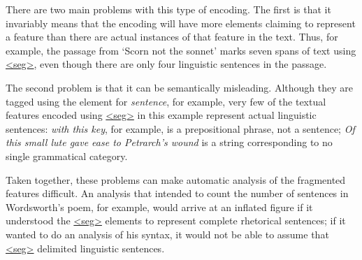 There are two main problems with this type of encoding. The first is that it invariably means that the encoding will have more elements claiming to represent a feature than there are actual instances of that feature in the text. Thus, for example, the passage from ‘Scorn not the sonnet’ marks seven spans of text using \hyperref[TEI.seg]{<seg>}, even though there are only four linguistic sentences in the passage.\par
The second problem is that it can be semantically misleading. Although they are tagged using the element for \textit{sentence}, for example, very few of the textual features encoded using \hyperref[TEI.seg]{<seg>} in this example represent actual linguistic sentences: \textit{with this key}, for example, is a prepositional phrase, not a sentence; \textit{Of this small lute gave ease to Petrarch's wound} is a string corresponding to no single grammatical category.\par
Taken together, these problems can make automatic analysis of the fragmented features difficult. An analysis that intended to count the number of sentences in Wordsworth's poem, for example, would arrive at an inflated figure if it understood the \hyperref[TEI.seg]{<seg>} elements to represent complete rhetorical sentences; if it wanted to do an analysis of his syntax, it would not be able to assume that \hyperref[TEI.seg]{<seg>} delimited linguistic sentences.\par
